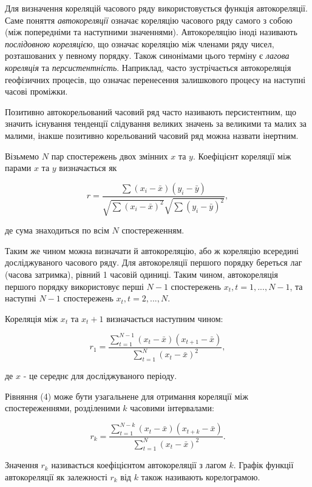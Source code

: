\documentclass[
  letterpaper,
]{report}
\begin{document}
Для визначення кореляцій часового ряду використовується функція
автокореляції. Саме поняття \emph{автокореляції} означає кореляцію
часового ряду самого з собою (між попередніми та наступними значеннями).
Автокореляцію іноді називають \emph{послідовною кореляцією}, що означає
кореляцію між членами ряду чисел, розташованих у певному порядку. Також
синонімами цього терміну є \emph{лагова кореляція} та
\emph{персистентність}. Наприклад, часто зустрічається автокореляція
геофізичних процесів, що означає перенесення залишкового процесу на
наступні часові проміжки.

Позитивно автокорельований часовий ряд часто називають персистентним, що
значить існування тенденції слідування великих значень за великими та
малих за малими, інакше позитивно корельований часовий ряд можна назвати
інертним.

Візьмемо \(N\) пар спостережень двох змінних \(x\) та \(y\). Коефіцієнт
кореляції між парами \(x\) та \(y\) визначається як

\[
    r = \frac{\sum \left( x_i - \bar{x} \right) \left( y_i - \bar{y} \right)}{\sqrt{\sum \left( x_i - \bar{x} \right)^{2}} \sqrt{\sum \left( y_i - \bar{y} \right)^{2}}}, \tag{3}
\]

де сума знаходиться по всім \(N\) спостереженням.

Таким же чином можна визначати й автокореляцію, або ж кореляцію
всередині досліджуваного часового ряду. Для автокореляції першого
порядку береться лаг (часова затримка), рівний 1 часовій одиниці. Таким
чином, автокореляція першого порядку використовує перші \(N−1\)
спостережень \(x_t, t = 1,..., N−1\), та наступні \(N−1\) спостережень
\(x_t , t = 2,..., N\).

Кореляція між \(x_t\) та \(x_t + 1\) визначається наступним чином:

\[
r_1 = \frac{\sum_{t=1}^{N-1} \left( x_t - \bar{x} \right) \left( x_{t+1} - \bar{x} \right)}{\sum_{t=1}^{N}\left( x_t - \bar{x} \right)^2}, \tag{4}
\]

де \(x\) - це середнє для досліджуваного періоду.

Рівняння (4) може бути узагальнене для отримання кореляції між
спостереженнями, розділеними \(k\) часовими інтервалами:

\[
    r_k = \frac{\sum_{t=1}^{N-k} \left( x_t - \bar{x} \right) \left( x_{t+k} - \bar{x} \right)}{\sum_{t=1}^{N}\left( x_t - \bar{x} \right)^2}. \tag{4}
\]

Значення \(r_k\) називається коефіцієнтом автокореляції з лагом \(k\).
Графік функції автокореляції як залежності \(r_k\) від \(k\) також
називають корелограмою.
\end{document}
